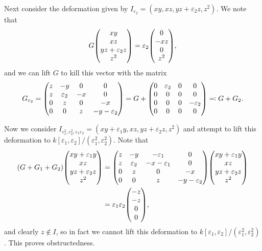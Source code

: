 \documentclass[leqno, openany]{memoir}
\theoremstyle{definition}
\theoremstyle{remark}
\theoremstyle{plain}
\theoremstyle{definition}
\theoremstyle{remark}
\newcommand{\ep}{\varepsilon}
\begin{document}
Next consider the deformation given by $I_{\ep_2} = (xy, xz, yz+\ep_2 z, z^2)$. We note that
\[ G \mqty(xy \\ xz \\ yz + \ep_2 z \\ z^2) = \ep_2 \mqty(0 \\ -xz \\ 0 \\ z^2), \]
and we can lift $G$ to kill this vector with the matrix
\[ G_{\ep_2} = \mqty(z & -y & 0 & 0 \\ z & \ep_2 & -x & 0 \\ 0 & z & 0 & -x \\ 0 & 0 & z & -y - \ep_2) = G + \mqty(0 & \ep_2 & 0 & 0 \\ 0 & 0 & 0 & 0 \\ 0 & 0 & 0 & -\ep_2 \\ 0 & 0 & 0 & 0) \eqqcolon G + G_2. \]

Now we consider $I_{\ep_1^2, \ep_2^2, \ep_1\ep_2} = (xy+\ep_1 y, xz, yz + \ep_2 z, z^2)$ and attempt to lift this deformation to $k[\ep_1, \ep_2]/(\ep_1^2, \ep_2^2)$. Note that 
\begin{align*} 
    (G + G_1 + G_2) \mqty(xy+\ep_1 y \\ xz \\ yz+\ep_2 z \\ z^2) &= \mqty(z & -y & -\ep_1 & 0 \\ z & \ep_2 & -x-\ep_1 & 0 \\ 0 & z & 0 & -x \\ 0 & 0 & z & -y - \ep_2) \mqty(xy+\ep_1 y \\ xz \\ yz+\ep_2 z \\ z^2) \\
    &= \ep_1 \ep_2 \mqty(-z \\ -z \\ 0 \\ 0),
\end{align*}
and clearly $z \notin I$, so in fact we cannot lift this deformation to $k[\ep_1, \ep_2]/(\ep_1^2, \ep_2^2)$. This proves obstructedness.
\end{document}
